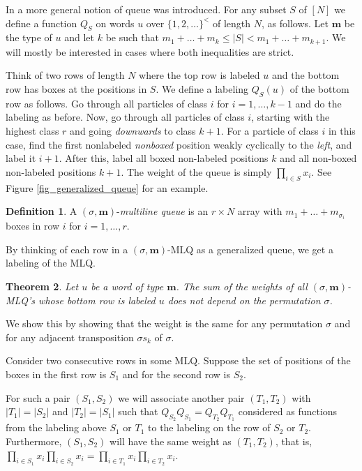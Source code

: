 \documentclass[reqno]{amsart}
\newcommand{\mbf}{\mathbf}
\let\prodnonlimits\prod
\renewcommand{\prod}{\prodnonlimits\limits}
\newcommand{\defn}[1]{{\color{darkred}\emph{#1}}} %
\theoremstyle{plain}
\newtheorem{thm}{Theorem}[section]
\theoremstyle{definition}
\newtheorem{dfn}[thm]{Definition}
\numberwithin{equation}{section}
\begin{document}
In \cite{AAMP} a more general notion of queue was introduced. For any subset $S$ of $[N]$ we define a function $Q_S$ on words $u$ over $\{1, 2, \dots \}^<$ of length $N$, as follows.
Let $\mbf{m}$ be the type of $u$ and let $k$ be such that $m_1 + \dots + m_k \leq |S| < m_1 + \dots + m_{k+1}$. We will mostly be interested in cases where both inequalities are strict.

Think of two rows of length $N$ where the top row is labeled $u$ and the bottom row has boxes at the positions in $S$. We define a labeling $Q_S(u)$ of the bottom row as follows. Go through all particles of class $i$ for $i = 1, \dots, k-1$ and do the labeling as before. Now, go through all particles of class $i$, starting with the highest class $r$ and going \emph{downwards} to class $k+1$. For a particle of class $i$ in this case, find the first nonlabeled \emph{nonboxed} position weakly cyclically to the \emph{left}, and label it $i+1$.
After this, label all boxed non-labeled positions $k$ and all non-boxed non-labeled positions $k+1$.
The weight of the queue is simply $\prod_{i\in S} x_i$.
See Figure \ref{fig_generalized_queue} for an example.

\begin{dfn} A $(\sigma, \mbf{m})$-\defn{multiline queue} is an $r \times N$ array with $m_1 + \dots + m_{\sigma_i}$ boxes in row $i$ for $i = 1, \dots, r$. \end{dfn}

By thinking of each row in a $(\sigma, \mbf{m})$-MLQ as a generalized queue, we get a labeling of the MLQ.


\begin{thm}
  Let $u$ be a word of type $\mbf{m}$. The sum of the weights of all $(\sigma, \mbf{m})$-MLQ's whose bottom row is labeled $u$ does not depend on the permutation $\sigma$.
\end{thm}

We show this by showing that the weight is the same for any permutation $\sigma$ and for any adjacent transposition $\sigma s_k$ of $\sigma$.

Consider two consecutive rows in some MLQ. Suppose the set of positions of the boxes in the first row is $S_1$ and for the second row is $S_2$.

For such a pair $(S_1, S_2)$ we will associate another pair $(T_1, T_2)$ with $|T_1| = |S_2|$ and $|T_2| = |S_1|$ such that $Q_{S_2}Q_{S_1} = Q_{T_2}Q_{T_1}$ considered as functions from the labeling above $S_1$ or $T_1$ to the labeling on the row of $S_2$ or $T_2$. Furthermore, $(S_1, S_2)$ will have the same weight as $(T_1, T_2)$, that is, $\prod_{i\in S_1} x_i \prod_{i\in S_2} x_i = \prod_{i\in T_1} x_i \prod_{i\in T_2} x_i$.
\end{document}
